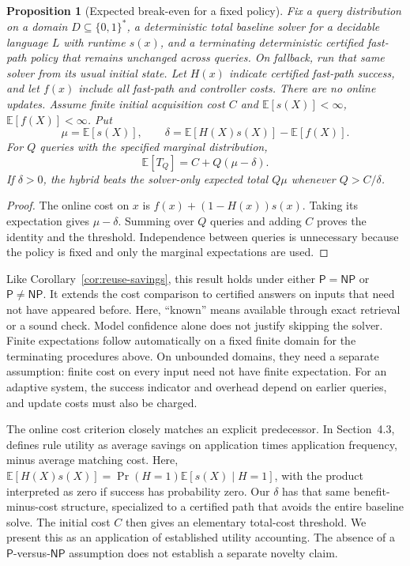\documentclass[11pt,a4paper]{article}
\numberwithin{equation}{section}
\newcommand{\Pclass}{\mathsf{P}}
\newcommand{\NPclass}{\mathsf{NP}}
\newcommand{\bits}{\{0,1\}}
\newcommand{\E}{\mathbb{E}}
\DeclareMathOperator{\Prb}{Pr}
\theoremstyle{plain}
\newtheorem{proposition}[lemma]{Proposition}
\theoremstyle{definition}
\theoremstyle{remark}
\begin{document}
\begin{proposition}[Expected break-even for a fixed policy]
\label{prop:savings}
Fix a query distribution on a domain $D\subseteq\bits^*$, a deterministic total baseline solver for a decidable language $L$ with runtime $s(x)$, and a terminating deterministic certified fast-path policy that remains unchanged across queries. On fallback, run that same solver from its usual initial state. Let $H(x)$ indicate certified fast-path success, and let $f(x)$ include all fast-path and controller costs. There are no online updates. Assume finite initial acquisition cost $C$ and $\E[s(X)]<\infty$, $\E[f(X)]<\infty$. Put
\begin{equation}
\mu=\E[s(X)],\qquad
\delta=\E[H(X)s(X)]-\E[f(X)].
\end{equation}
For $Q$ queries with the specified marginal distribution,
\begin{equation}
\E[T_Q]=C+Q(\mu-\delta).
\label{eq:savings}
\end{equation}
If $\delta>0$, the hybrid beats the solver-only expected total $Q\mu$ whenever $Q>C/\delta$.
\end{proposition}

\begin{proof}
The online cost on $x$ is $f(x)+(1-H(x))s(x)$. Taking its expectation gives $\mu-\delta$. Summing over $Q$ queries and adding $C$ proves the identity and the threshold. Independence between queries is unnecessary because the policy is fixed and only the marginal expectations are used.
\end{proof}

Like Corollary~\ref{cor:reuse-savings}, this result holds under either $\Pclass=\NPclass$ or $\Pclass\neq\NPclass$. It extends the cost comparison to certified answers on inputs that need not have appeared before. Here, ``known'' means available through exact retrieval or a sound check. Model confidence alone does not justify skipping the solver. Finite expectations follow automatically on a fixed finite domain for the terminating procedures above. On unbounded domains, they need a separate assumption: finite cost on every input need not have finite expectation. For an adaptive system, the success indicator and overhead depend on earlier queries, and update costs must also be charged.

The online cost criterion closely matches an explicit predecessor. In Section~4.3, \citet[p.~566]{minton1988utility} defines rule utility as average savings on application times application frequency, minus average matching cost. Here, $\E[H(X)s(X)]=\Prb(H=1)\E[s(X)\mid H=1]$, with the product interpreted as zero if success has probability zero. Our $\delta$ has that same benefit-minus-cost structure, specialized to a certified path that avoids the entire baseline solve. The initial cost $C$ then gives an elementary total-cost threshold. We present this as an application of established utility accounting. The absence of a $\Pclass$-versus-$\NPclass$ assumption does not establish a separate novelty claim.
\end{document}
